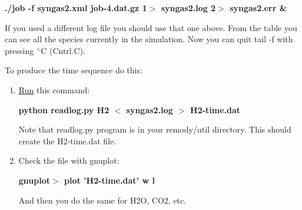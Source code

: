 \begin{itemize}
{\par
{\bf  ./job -f syngas2.xml job-4.dat.gz 1$>$ syngas2.log 2$>$ syngas2.err \& }\par
\par
 If you used a different log file you should use that one above. From the table you can see all the species currently in the simulation. Now you can quit tail -f with pressing $^\wedge$C (Cntrl.C). \par
\par
 To produce the time sequence do this: \par
\par
\begin{enumerate}
\item \hyperlink{namespaceRun}{Run} this command: \par
\par
{\bf  python readlog.py H2 $<$ syngas2.log $>$ H2-time.dat }\par
\par
 Note that readlog.py program is in your remody/util directory. This should create the H2-time.dat file.\par
 \par
\item Check the file with gnuplot: \par
\par
{\bf  gnuplot$>$ plot 'H2-time.dat' w l }\par
\par
 And then you do the same for H2O, CO2, etc.\end{enumerate}
}\end{itemize}


